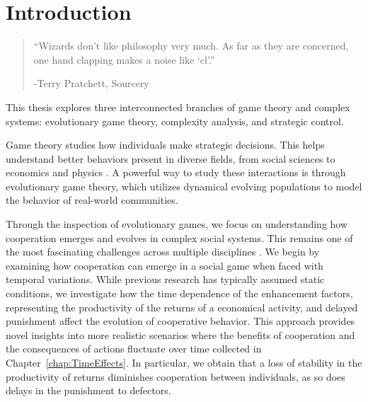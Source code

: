 \chapter{Introduction}
\label{chap:Intro}

\begin{quotation}

\vspace{-3cm}

\begin{flushright}
\begin{minipage}[t][5cm][b]{0.5\textwidth}
{ ``Wizards don’t like philosophy very much. As far as they are concerned, one hand clapping makes a noise like `cl'.''}

\bigskip

-{\small  Terry Pratchett, Sourcery }
\end{minipage}
\end{flushright}

\vspace{0.5cm}

\end{quotation}



This thesis explores three interconnected branches of game theory and complex systems: evolutionary game theory, complexity analysis, and strategic control. 

Game theory studies how individuals make strategic decisions. This helps understand better behaviors present in diverse fields, from social sciences to economics and physics \cite{Social,EconomyGames,GamesComplex}. A powerful way to study these interactions is through evolutionary game theory, which utilizes dynamical evolving populations to model the behavior of real-world communities. 

Through the inspection of evolutionary games, we focus on understanding how cooperation emerges and evolves in complex social systems. This remains one of the most fascinating challenges across multiple disciplines \cite{SocialPhy}. We begin by examining how cooperation can emerge in a social game when faced with temporal variations.  While previous research has typically assumed static conditions, we investigate how the time dependence of the enhancement factors, representing the productivity of the returns of a economical activity, and delayed punishment affect the evolution of cooperative behavior. This approach provides novel insights into more realistic scenarios where the benefits of cooperation and the consequences of actions fluctuate over time collected in Chapter~\ref{chap:TimeEffects}. In particular, we obtain that a loss of stability in the productivity of returns diminishes cooperation between individuals, as so does delays in the punishment to defectors.

